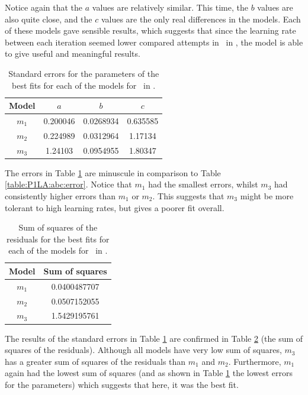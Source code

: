 Notice again that the $a$ values are relatively similar.
This time, the $b$ values are also quite close, and the $c$ values are the only
real differences in the models.
Each of these models gave sensible results, which suggests that since the
learning rate between each iteration seemed lower compared attempts in \PO\ in
\LB, the model is able to give useful and meaningful results.

\begin{table}[ht!]
\centering
\begin{tabular}{|c|c|c|c|}
\hline
{\bf Model} &  $a$ & $b$ & $c$ \\
\hline
$m_1$ & 0.200046 & 0.0268934 & 0.635585 \\
\hline
$m_2$ & 0.224989 & 0.0312964 & 1.17134\\
\hline
$m_3$ & 1.24103 & 0.0954955 & 1.80347 \\
\hline
\end{tabular}
\caption{Standard errors for the parameters of the best fits for each of the models for \PO\ in \LB.}
\label{table:P1LB:abc:error}
\end{table}

The errors in Table \ref{table:P1LB:abc:error} are minuscule in comparison to
Table \ref{table:P1LA:abc:error}.
Notice that $m_1$ had the smallest errors, whilst $m_3$ had consistently higher
errors than $m_1$ or $m_2$.
This suggests that $m_3$ might be more tolerant to high learning rates, but
gives a poorer fit overall.

\begin{table}[ht!]
\centering
\begin{tabular}{|c|c|}
\hline
{\bf Model} & Sum of squares \\
\hline
$m_1$ & 0.0400487707\\
\hline
$m_2$ & 0.0507152055\\
\hline
$m_3$ & 1.5429195761\\
\hline
\end{tabular}
\caption{Sum of squares of the residuals for the best fits for each of the models for \PO\ in \LB.}
\label{table:P1LB:abc:sumsquares}
\end{table}

The results of the standard errors in Table \ref{table:P1LB:abc:error} are
confirmed in Table \ref{table:P1LB:abc:sumsquares} (the sum of squares of the
residuals).
Although all models have very low sum of squares, $m_3$ has a greater sum of
squares of the residuals than $m_1$ and $m_2$.
Furthermore, $m_1$ again had the lowest sum of squares (and as shown in Table
\ref{table:P1LB:abc:error} the lowest errors for the parameters) which suggests
that here, it was the best fit.

